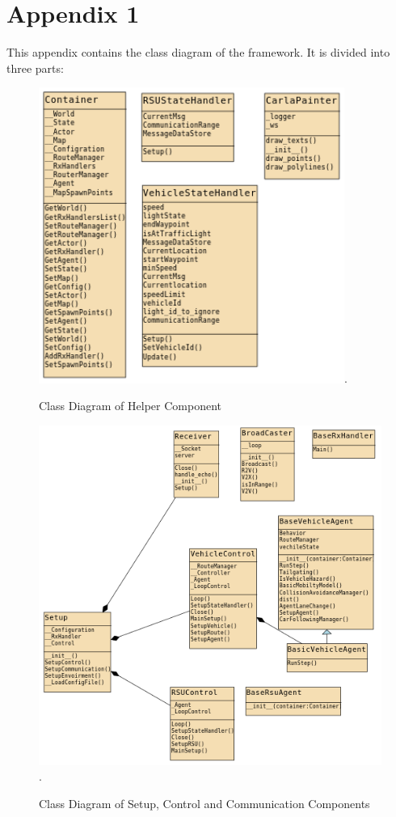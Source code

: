 \chapter*{Appendix 1}

This appendix contains the class diagram of the framework. It is divided into three parts:
\begin{figure}[h!]
    \centering
    \includegraphics[width=10cm]{Framework/Images/CD2.png}.
    \caption{Class Diagram of Helper Component}
\end{figure}
\begin{figure}[h!]
    \centering
    \includegraphics[width=15cm]{Framework/Images/CD1.png}.
    \caption{Class Diagram of Setup, Control and Communication Components}

\end{figure}

